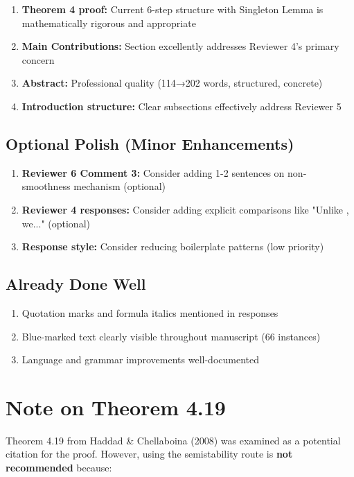 \documentclass[11pt]{article}
\begin{document}
\begin{enumerate}
\item \textcolor{success}{\textbf{Theorem 4 proof:}} Current 6-step structure with Singleton Lemma is mathematically rigorous and appropriate
\item \textcolor{success}{\textbf{Main Contributions:}} Section excellently addresses Reviewer 4's primary concern
\item \textcolor{success}{\textbf{Abstract:}} Professional quality (114→202 words, structured, concrete)
\item \textcolor{success}{\textbf{Introduction structure:}} Clear subsections effectively address Reviewer 5
\end{enumerate}

\subsection{Optional Polish (Minor Enhancements)}

\begin{enumerate}
\item \textcolor{warning}{\textbf{Reviewer 6 Comment 3:}} Consider adding 1-2 sentences on non-smoothness mechanism (optional)
\item \textcolor{warning}{\textbf{Reviewer 4 responses:}} Consider adding explicit comparisons like "Unlike \cite{X}, we..." (optional)
\item \textbf{Response style:} Consider reducing boilerplate patterns (low priority)
\end{enumerate}

\subsection{Already Done Well}

\begin{enumerate}
\item Quotation marks and formula italics mentioned in responses
\item Blue-marked text clearly visible throughout manuscript (66 instances)
\item Language and grammar improvements well-documented
\end{enumerate}

\section{Note on Theorem 4.19}

Theorem 4.19 from Haddad \& Chellaboina (2008) was examined as a potential citation for the proof. However, using the semistability route is \textbf{not recommended} because:
\end{document}
